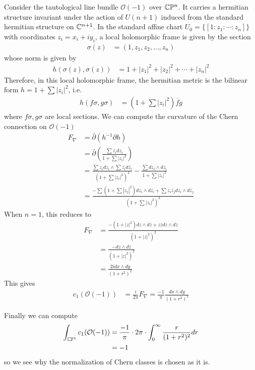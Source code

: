 \documentclass[12pt]{article}
\begin{document}
    \begin{example}\label{ex:tautological-bundle}
        Consider the tautological line bundle $\mathcal{O}(-1)$ over $\mathbb{C} \mathbb{P}^n$. It carries a hermitian structure invariant under the action of $U(n+1)$ induced from the standard hermitian structure on $\mathbb{C}^{n+1}$. In the standard affine chart $U_0 = \{ [1:z_1:\cdots:z_n] \}$ with coordinates $z_i = x_i + i y_i$, a local holomorphic frame is given by the section \begin{align*}
            \sigma(z) & = (1, z_1, z_2, \ldots, z_n)
        \end{align*} whose norm is given by \begin{align*}
            h(\sigma(z), \sigma(z)) & = 1 + |z_1|^2 + |z_2|^2 + \cdots + |z_n|^2
        \end{align*} Therefore, in this local holomorphic frame, the hermitian metric is the bilinear form $h = 1 + \sum |z_i|^2$, i.e. \begin{align*}
            h(f \sigma, g \sigma) & = (1 + \sum |z_i|^2) \overline{f} g
        \end{align*} where $f\sigma, g\sigma$ are local sections. We can compute the curvature of the Chern connection on $\mathcal{O}(-1)$ \begin{align*}
            F_\nabla & = \bar{\partial} \left( h^{-1} \partial h \right) \\
            & = \bar{\partial} \left( \frac{\sum \overline{z_i} d z_i}{1 + \sum |z_i|^2} \right) \\
            & = \frac{\sum z_i d z_i \wedge \sum \overline{z_i} d \overline{z_i}}{(1 + \sum |z_i|^2)^2} - \frac{\sum d z_i \wedge d \overline{z_i}}{1 + \sum |z_i|^2} \\
            & = \frac{-\sum (1 + \sum |z_j|^2) d z_i \wedge d \overline{z_i} + \sum z_i \overline{z_j} d z_i \wedge d \overline{z_j}}{(1 + \sum |z_i|^2)^2}
        \end{align*}
        When $n=1$, this reduces to \begin{align*}
            F_\nabla & = \frac{-(1 + |z|^2) d z \wedge d \overline{z} + z \overline{z} d z \wedge d \overline{z}}{(1 + |z|^2)^2} \\
            & = \frac{-d z \wedge d \overline{z}}{(1 + |z|^2)^2} \\
            &= \frac{2i d x \wedge d y}{(1 + r^2)^2}
        \end{align*} This gives \begin{align*}
            c_1(\mathcal{O}(-1)) & = \frac{i}{2\pi} F_\nabla = \frac{-1}{\pi} \frac{d x \wedge d y}{(1 + r^2)^2}
        \end{align*}
        
        Finally we can compute \begin{align*}
            \int_{\mathbb{C} \mathbb{P}^1} c_1(\mathcal{O}(-1)) &= \frac{-1}{\pi} \cdot 2\pi \cdot \int_0^\infty \frac{r}{(1 + r^2)^2} d r \\
            & = -1
        \end{align*} so we see why the normalization of Chern classes is chosen as it is.
    \end{example}
\end{document}
